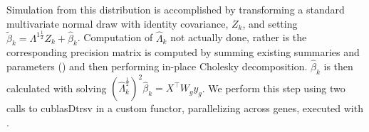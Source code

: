 Simulation from this distribution is accomplished by transforming a standard multivariate normal draw with identity covariance, $Z_k$, and setting $\tilde{\beta}_k = \Lambda^{1\frac{1}{2}} Z_k + \hat{\beta}_k$. Computation of $\hat{\Lambda}_k$ not actually done, rather is the corresponding precision matrix is computed by summing existing summaries  and parameters () and then performing in-place Cholesky decomposition. $\hat{\beta}_k$ is then calculated with solving  $(\hat{\Lambda}_k^{\frac{1}{2}})^2\hat{\beta}_k=X^\top W_g y_g$. We perform this step using two calls to cublasDtrsv in a custom functor, parallelizing across genes, executed with . 
% 
% 
% 
% 
% 
% 
% 
